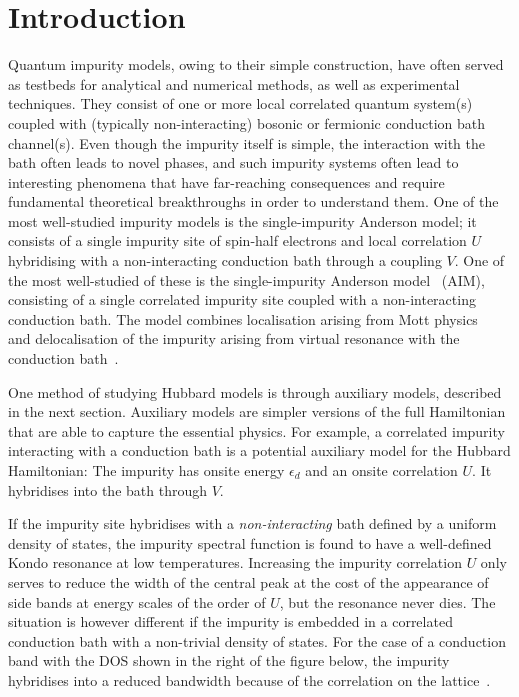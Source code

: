 \documentclass[reprint,superscriptaddress,floatfix]{revtex4-2}
\begin{document}
\section{Introduction}

Quantum impurity models, owing to their simple construction, have often served as testbeds for analytical and numerical methods, as well as experimental techniques. They consist of one or more local correlated quantum system(s) coupled with (typically non-interacting) bosonic or fermionic conduction bath channel(s). Even though the impurity itself is simple, the interaction with the bath often leads to novel phases, and such impurity systems often lead to interesting phenomena that have far-reaching consequences and require fundamental theoretical breakthroughs in order to understand them. One of the most well-studied impurity models is the single-impurity Anderson model; it consists of a single impurity site of spin-half electrons and local correlation \(U\) hybridising with a non-interacting conduction bath through a coupling \(V\). One of the most well-studied of these is the single-impurity Anderson model~\cite{anderson_1961,anderson_1978} (AIM), consisting of a single correlated impurity site coupled with a non-interacting conduction bath. The model combines localisation arising from Mott physics~\cite{Mott_1949,vanvleck_1953} and delocalisation of the impurity arising from virtual resonance with the conduction bath~\cite{friedel_1956}.


One method of studying Hubbard models is through auxiliary models, described in the next section. Auxiliary models are simpler versions of the full Hamiltonian that are able to capture the essential physics. For example, a correlated impurity interacting with a conduction bath is a potential auxiliary model for the Hubbard Hamiltonian:
The impurity has onsite energy \(\epsilon_d\) and an onsite correlation \(U\). It hybridises into the bath through \(V\).

If the impurity site hybridises with a {\it non-interacting} bath defined by a uniform density of states, the impurity spectral function is found to have a well-defined Kondo resonance at low temperatures. Increasing the impurity correlation \(U\) only serves to reduce the width of the central peak at the cost of the appearance of side bands at energy scales of the order of \(U\), but the resonance never dies. The situation is however different if the impurity is embedded in a correlated conduction bath with a non-trivial density of states. For the case of a conduction band with the DOS shown in the right of the figure below, the impurity hybridises into a reduced bandwidth because of the correlation on the lattice~\cite{held_2013}.
\end{document}
